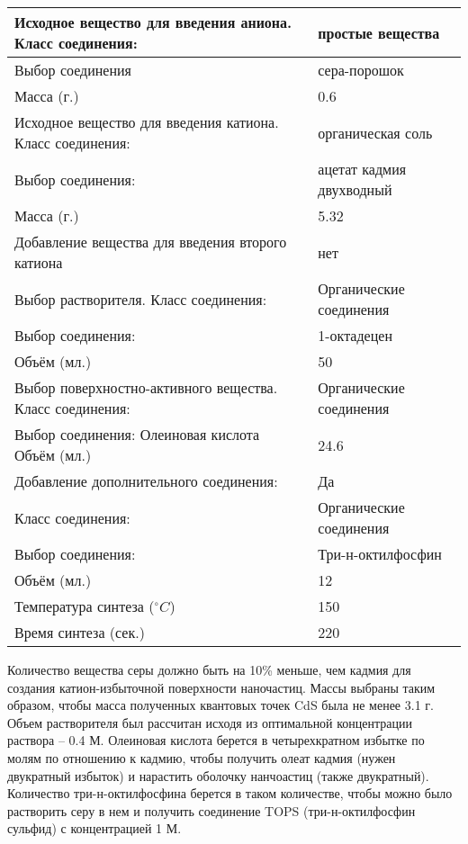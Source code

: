 \begin{enumerate}
    \begin{longtable}{|p{8cm}|p{6cm}|}
        \hline
        Исходное вещество для введения аниона. Класс соединения:	& простые вещества \\
        \hline
        Выбор соединения	& сера-порошок \\
        \hline
        Масса (г.) & 	0.6 \\
        \hline
        Исходное вещество для введения катиона. Класс соединения:	& органическая соль \\
        \hline
        Выбор соединения:	& ацетат кадмия двухводный \\
        \hline
        Масса (г.)	& 5.32 \\
        \hline
        Добавление вещества для введения второго катиона	& нет \\
        \hline
        Выбор растворителя. Класс соединения:	& Органические соединения \\
        \hline
        Выбор соединения:	& 1-октадецен \\
        \hline
        Объём (мл.)& 	50 \\
        \hline
        Выбор поверхностно-активного вещества. Класс соединения:	& Органические соединения \\
        \hline
        Выбор соединения:	Олеиновая кислота
        Объём (мл.)	& 24.6 \\
        \hline
        Добавление дополнительного соединения: &	Да \\
        \hline
        Класс соединения:	& Органические соединения \\
        \hline
        Выбор соединения: & Три-н-октилфосфин \\
        \hline
        Объём (мл.)	& 12 \\
        \hline
        Температура синтеза ($^\circ C$) & 150 \\
        \hline
        Время синтеза (сек.) & 220 \\
        \hline
    \end{longtable}

    Количество вещества серы должно быть на 10\% меньше, чем кадмия для создания катион-избыточной поверхности наночастиц. Массы выбраны таким образом, чтобы масса полученных квантовых точек CdS была не менее 3.1 г. Объем растворителя был рассчитан исходя из оптимальной концентрации раствора – 0.4 М. Олеиновая кислота берется в четырехкратном избытке по молям по отношению к кадмию, чтобы получить олеат кадмия (нужен двукратный избыток) и нарастить оболочку нанчоастиц (также двукратный). Количество три-н-октилфосфина берется в таком количестве, чтобы можно было растворить серу в нем и получить соединение TOPS (три-н-октилфосфин сульфид) с концентрацией 1 М.


\end{enumerate}
